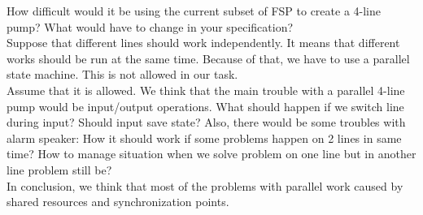 \documentclass{article}
\begin{document}
How difficult would it be using the current subset of FSP to create
a 4-line pump? What would have to change in your specification?\\

Suppose that different lines should work independently. It means that different works should be run at the same time. Because of that, we have to use a parallel state machine. This is not allowed in our task.\\
Assume that it is allowed. We think that the main trouble with a parallel 4-line pump would be input/output operations. What should happen if we switch line during input? Should input save state? Also, there would be some troubles with alarm speaker: How it should work if some problems happen on 2 lines in same time? How to manage situation when we solve problem on one line but in another line problem still be?\\
In conclusion, we think that most of the problems with parallel work caused by shared resources and synchronization points.
\end{document}
